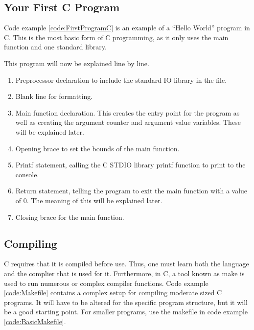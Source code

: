 		\subsection{Your First C Program}
			Code example \ref{code:FirstProgramC} is an example of a ``Hello World'' program in C. 
			This is the most basic form of C programming, as it only uses the main function and one standard library. 
			\begin{code}
				C}]{./first.c}
				\caption{A Simple Hello World Program in C}
				\label{code:FirstProgramC}
			\end{code}
			This program will now be explained line by line. 
			\begin{enumerate}
				\item Preprocessor declaration to include the standard IO library in the file. 
				\item Blank line for formatting. 
				\item Main function declaration. 
					This creates the entry point for the program as well as creating the argument counter and argument value variables. 
					These will be explained later. 
				\item Opening brace to set the bounds of the main function. 
				\item Printf statement, calling the C STDIO library printf function to print to the console. 
				\item Return statement, telling the program to exit the main function with a value of 0. 
					The meaning of this will be explained later. 
				\item Closing brace for the main function. 
			\end{enumerate}
		\subsection{Compiling}
			C requires that it is compiled before use. 
			Thus, one must learn both the language and the complier that is used for it. 
			Furthermore, in C, a tool known as make is used to run numerous or complex compiler functions. 
			Code example \ref{code:Makefile} contains a complex setup for compiling moderate sized C programs. 
			It will have to be altered for the specific program structure, but it will be a good starting point. 
			For smaller programs, use the makefile in code example \ref{code:BasicMakefile}.

			\begin{code}
				make}]{./makefile}
				\caption{A Basic Makefile}
				\label{code:BasicMakefile}
			\end{code}

